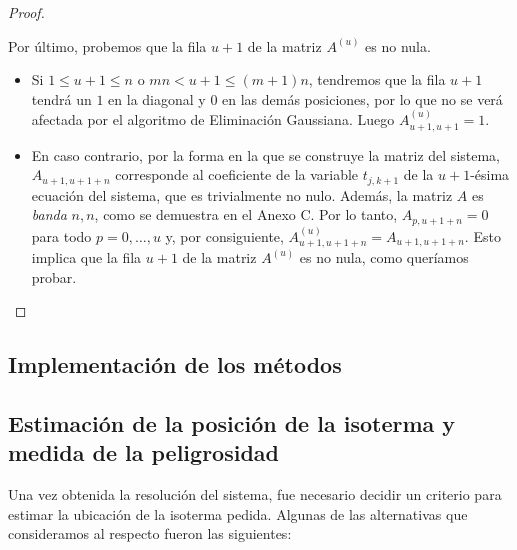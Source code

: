 \documentclass[11pt, a4paper, spanish]{article}
\theoremstyle{plain}
\theoremstyle{remark}
\begin{document}
\begin{proof}
\begin{itemize}
          Por último, probemos que la fila $u + 1$ de la matriz $A^{(u)}$ es no nula.
          \begin{itemize}
            \item Si $1 \leq u + 1 \leq n$ o $mn < u + 1 \leq (m+1)n$, tendremos que la fila $u + 1$ tendrá un $1$ en la diagonal y $0$ en las demás posiciones, por lo que no se verá afectada por el algoritmo de Eliminación Gaussiana. Luego $A^{(u)}_{u+1,u+1} = 1$.
            \item En caso contrario, por la forma en la que se construye la matriz del sistema, $A_{u+1,u+1+n}$ corresponde al coeficiente de la variable $t_{j,k+1}$ de la $u + 1$-ésima ecuación del sistema, que es trivialmente no nulo. Además, la matriz $A$ es \emph{banda} $n, n$, como se demuestra en el Anexo C. Por lo tanto, $A_{p,u+1+n} = 0$ para todo $p = 0, \dots, u$ y, por consiguiente, $A^{(u)}_{u+1,u+1+n} = A_{u+1,u+1+n}$. Esto implica que la fila $u + 1$ de la matriz $A^{(u)}$ es no nula, como queríamos probar. \qedhere
          \end{itemize}
        \end{itemize}
      \end{proof}

  \subsection{Implementación de los métodos}

  \subsection{Estimación de la posición de la isoterma y medida de la peligrosidad}

    Una vez obtenida la resolución del sistema, fue necesario decidir un criterio para estimar la ubicación de la isoterma pedida. Algunas de las alternativas que consideramos al respecto fueron las siguientes:
\end{document}
